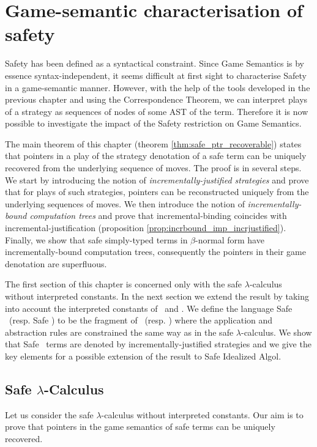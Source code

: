 \chapter{Game-semantic characterisation of safety}

Safety has been defined as a syntactical constraint. Since Game
Semantics is by essence syntax-independent, it seems difficult at
first sight to characterise Safety in a game-semantic manner.
However, with the help of the tools developed in the previous
chapter and using the Correspondence Theorem, we can interpret plays
of a strategy as sequences of nodes of some AST of the term.
Therefore it is now possible to investigate the impact of the Safety
restriction on Game Semantics.


The main theorem of this chapter (theorem
\ref{thm:safe_ptr_recoverable}) states that pointers in a play of
the strategy denotation of a safe term can be uniquely recovered
from the underlying sequence of moves. The proof is in several
steps. We start by introducing the notion of
\emph{incrementally-justified strategies} and prove that for plays
of such strategies, pointers can be reconstructed uniquely from the
underlying sequences of moves. We then introduce the notion of
\emph{incrementally-bound computation trees} and prove that
incremental-binding coincides with incremental-justification
(proposition \ref{prop:incrbound_imp_incrjustified}). Finally, we
show that safe simply-typed terms in $\beta$-normal form have
incrementally-bound computation trees, consequently the pointers in
their game denotation are superfluous.


The first section of this chapter is concerned only with the safe $\lambda$-calculus without interpreted constants. In the next
section we extend the result by taking into account the interpreted
constants of \pcf\ and \ialgol. We define the language Safe \ialgol\
(resp. Safe \pcf) to be the fragment of \ialgol\ (resp. \pcf) where
the application and abstraction rules are constrained the same way
as in the safe $\lambda$-calculus. We show that Safe \pcf\ terms are
denoted by incrementally-justified strategies and we give the key
elements for a possible extension of the result to Safe Idealized
Algol.

\section{Safe $\lambda$-Calculus}
Let us consider the safe $\lambda$-calculus without interpreted
constants. Our aim is to prove that pointers in the game semantics
of safe terms can be uniquely recovered.

